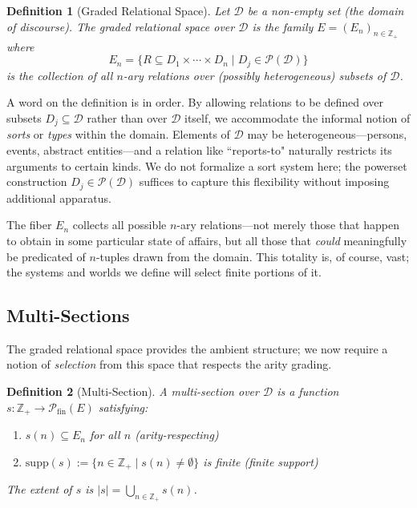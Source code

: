 \documentclass[12pt,a4paper]{article}
\newtheorem{definition}{Definition}[section]
\newcommand{\domain}{\mathcal{D}}
\newcommand{\powerset}{\mathcal{P}}
\newcommand{\pfin}{\mathcal{P}_{\mathrm{fin}}}
\newcommand{\supp}{\mathrm{supp}}
\begin{document}
\begin{definition}[Graded Relational Space]
\label{def:graded-rel-space}
Let $\domain$ be a non-empty set (the \emph{domain of discourse}). The \emph{graded relational space} over $\domain$ is the family $E = (E_n)_{n \in \mathbb{Z}_+}$ where
$$
E_n = \{R \subseteq D_1 \times \cdots \times D_n \mid D_j \in \powerset(\domain)\}
$$
is the collection of all $n$-ary relations over (possibly heterogeneous) subsets of $\domain$.
\end{definition}

A word on the definition is in order. By allowing relations to be defined over subsets $D_j \subseteq \domain$ rather than over $\domain$ itself, we accommodate the informal notion of \emph{sorts} or \emph{types} within the domain. Elements of $\domain$ may be heterogeneous---persons, events, abstract entities---and a relation like ``reports-to" naturally restricts its arguments to certain kinds. We do not formalize a sort system here; the powerset construction $D_j \in \powerset(\domain)$ suffices to capture this flexibility without imposing additional apparatus.

The fiber $E_n$ collects all possible $n$-ary relations---not merely those that happen to obtain in some particular state of affairs, but all those that \emph{could} meaningfully be predicated of $n$-tuples drawn from the domain. This totality is, of course, vast; the systems and worlds we define will select finite portions of it.

\subsection{Multi-Sections}

The graded relational space provides the ambient structure; we now require a notion of \emph{selection} from this space that respects the arity grading.

\begin{definition}[Multi-Section]
\label{def:multi-section}
A \emph{multi-section} over $\domain$ is a function $s : \mathbb{Z}_+ \to \pfin(E)$ satisfying:
\begin{enumerate}[label=(\roman*)]
    \item $s(n) \subseteq E_n$ for all $n$ \hfill (arity-respecting)
    \item $\supp(s) := \{n \in \mathbb{Z}_+ \mid s(n) \neq \emptyset\}$ is finite \hfill (finite support)
\end{enumerate}
The \emph{extent} of $s$ is $|s| = \bigcup_{n \in \mathbb{Z}_+} s(n)$.
\end{definition}
\end{document}
